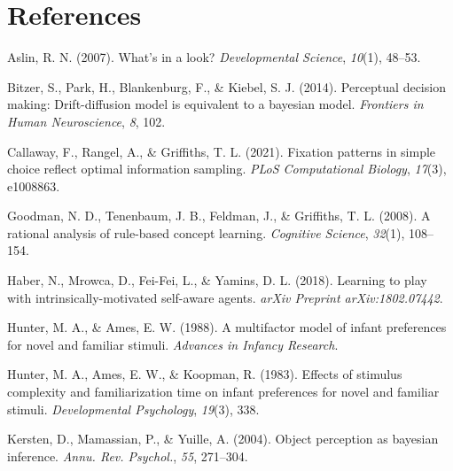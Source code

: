 \documentclass[10pt, letterpaper]{article}
\newenvironment{CSLReferences}%
  {}%
  {\par}
\begin{document}
\hypertarget{references}{%
\section{References}\label{references}}

\setlength{\parindent}{-0.1in} 
\setlength{\leftskip}{0.125in}

\noindent

\hypertarget{refs}{}
\begin{CSLReferences}{1}{0}
\leavevmode{}%
Aslin, R. N. (2007). What's in a look? \emph{Developmental Science},
\emph{10}(1), 48--53.

\leavevmode{}%
Bitzer, S., Park, H., Blankenburg, F., \& Kiebel, S. J. (2014).
Perceptual decision making: Drift-diffusion model is equivalent to a
bayesian model. \emph{Frontiers in Human Neuroscience}, \emph{8}, 102.

\leavevmode{}%
Callaway, F., Rangel, A., \& Griffiths, T. L. (2021). Fixation patterns
in simple choice reflect optimal information sampling. \emph{PLoS
Computational Biology}, \emph{17}(3), e1008863.

\leavevmode{}%
Goodman, N. D., Tenenbaum, J. B., Feldman, J., \& Griffiths, T. L.
(2008). A rational analysis of rule-based concept learning.
\emph{Cognitive Science}, \emph{32}(1), 108--154.

\leavevmode{}%
Haber, N., Mrowca, D., Fei-Fei, L., \& Yamins, D. L. (2018). Learning to
play with intrinsically-motivated self-aware agents. \emph{arXiv
Preprint arXiv:1802.07442}.

\leavevmode{}%
Hunter, M. A., \& Ames, E. W. (1988). A multifactor model of infant
preferences for novel and familiar stimuli. \emph{Advances in Infancy
Research}.

\leavevmode{}%
Hunter, M. A., Ames, E. W., \& Koopman, R. (1983). Effects of stimulus
complexity and familiarization time on infant preferences for novel and
familiar stimuli. \emph{Developmental Psychology}, \emph{19}(3), 338.

\leavevmode{}%
Kersten, D., Mamassian, P., \& Yuille, A. (2004). Object perception as
bayesian inference. \emph{Annu. Rev. Psychol.}, \emph{55}, 271--304.


\end{CSLReferences}
\end{document}
